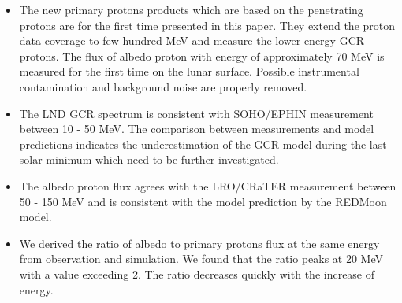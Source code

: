 \begin{itemize}
    \item  The new primary protons products which are based on the penetrating protons are for the first time presented in this paper. They extend the proton data coverage to few hundred MeV and measure the lower energy \ac{GCR} protons. The flux of albedo proton with energy of approximately 70 MeV is measured for the first time on the lunar surface. Possible instrumental contamination and background noise are properly removed.
    \item The \ac{LND} \ac{GCR} spectrum is consistent with \ac{SOHO}/\ac{EPHIN} measurement between 10 - 50 MeV.
    The comparison between measurements and model predictions indicates the underestimation of the GCR model during the last solar minimum which need to be further investigated.
    \item  The albedo proton flux agrees with the \ac{LRO}/\ac{CRaTER} measurement between 50 - 150 MeV and is consistent with the model prediction by the \ac{REDMoon} model.
    \item We derived the ratio of albedo to primary protons flux at the same energy from observation and simulation. We found that the ratio peaks at 20 MeV with a value exceeding 2. The ratio decreases quickly with the increase of energy.
\end{itemize}



